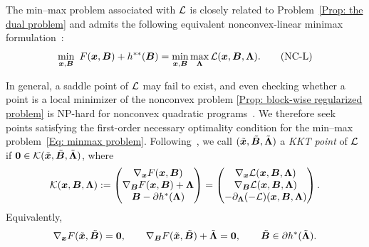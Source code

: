 The min--max problem associated with $\mathcal{L}$ is closely related to Problem~\eqref{Prop: the dual problem} and admits the following equivalent nonconvex-linear minimax formulation~\cite{xu2026rada}:
\begin{equation}\label{Eq: minmax problem}
\min_{\bx,\bB}\ F(\bx,\bB)+h^{**}(\bB) = \min_{\bx,\bB}\max_{\bLmbd}\calL(\bx,\bB,\bLmbd).\tag{NC-L}
\end{equation}

In general, a saddle point of $\mathcal{L}$ may fail to exist, and even checking whether a point is a local minimizer of the nonconvex problem \eqref{Prop: block-wise regularized problem} is NP-hard for nonconvex quadratic programs~\cite{Murty1987NP}. We therefore seek points satisfying the first-order necessary optimality condition for the min--max problem~\eqref{Eq: minmax problem}. Following~\cite{chambolleFirstOrderPrimalDualAlgorithm2011,
clasonAccelerationGlobalConvergence2019,
botBohm2023alternating}, we call
$(\tilde{\bm{x}},\tilde{\bm{B}},\tilde{\bm{\Lambda}})$ a
\emph{KKT point} of $\mathcal{L}$ if
$\bm{0}\in\mathcal{K}(\tilde{\bm{x}},\tilde{\bm{B}},\tilde{\bm{\Lambda}})$,
where
\begin{equation}\label{Eq: KKT mapping}
\mathcal{K}(\bx,\bB,\bLmbd):=
\begin{pmatrix}
\nabla_{\bx}F(\bx,\bB)\\
\nabla_{\bB}F(\bx,\bB)+\bLmbd\\
\bB-\partial h^*(\bLmbd)
\end{pmatrix}
=
\begin{pmatrix}
\nabla_{\bx}\calL(\bx,\bB,\bLmbd)\\
\nabla_{\bB}\calL(\bx,\bB,\bLmbd)\\
-\partial_{\bLmbd}(-\calL)(\bx,\bB,\bLmbd)
\end{pmatrix}.
\end{equation}
Equivalently,
\begin{equation}\label{Eq: KKT conditions}
\nabla_{\bx}F(\tilde{\bx},\tilde{\bB})=\bm{0},
\qquad
\nabla_{\bB}F(\tilde{\bx},\tilde{\bB})
+\tilde{\bLmbd}=\bm{0},
\qquad
\tilde{\bB}\in\partial h^*(\tilde{\bLmbd}).
\end{equation}

